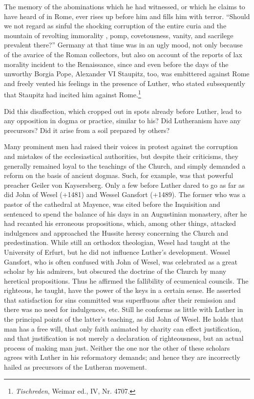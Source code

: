The memory of the abominations which he had witnessed, or
which he claims to have heard of in Rome, ever rises up before
him and fills him with terror. “Should we not regard as sinful the
shocking corruption of the entire curia and the mountain of revolting immorality
, pomp, covetousness, vanity, and sacrilege prevalent
there?” Germany at that time was in an ugly mood, not only
because of the avarice of the Roman collectors, but also on account
of the reports of lax morality incident to the Renaissance, since and
even before the days of the unworthy Borgia Pope, Alexander VI
Staupitz, too, was embittered against Rome and freely vented his feelings
in the presence of Luther, who stated subsequently that Staupitz
had incited him against Rome.\footnote{\textit{Tischreden}, Weimar ed., IV, Nr. 4707.}

Did this disaffection, which cropped out in spots already before
Luther, lead to any opposition in dogma or practice, similar to his?
Did Lutheranism have any precursors? Did it arise from a soil
prepared by others?

Many prominent men had raised their voices in protest against
the corruption and mistakes of the ecclesiastical authorities, but
despite their criticisms, they generally remained loyal to the teachings
of the Church, and simply demanded a reform on the basis
of ancient dogmas. Such, for example, was that powerful preacher
Geiler von Kaysersberg. Only a few before Luther dared to go as
far as did John of Wesel (+1481) and Wessel Gansfort (+1489).
The former who was a pastor of the cathedral at Mayence,
was cited before the Inquisition and sentenced to spend the balance
of his days in an Augustinian monastery, after he had recanted
his erroneous propositions, which, among other things, attacked indulgences
and approached the Hussite heresy concerning the Church
and predestination. While still an orthodox theologian, Wesel had
taught at the University of Erfurt, but he did not influence Luther’s
development. Wessel Gansfort, who is often confused with John
of Wesel, was celebrated as a great scholar by his admirers, but
obscured the doctrine of the Church by many heretical propositions.
Thus he affirmed the fallibility of ecumenical councils. The
righteous, he taught, have the power of the keys in a certain sense.
He asserted that satisfaction for sins committed was superfluous
after their remission and there was no need for indulgences, etc.
Still he conforms as little with Luther in the principal points of
the latter’s teaching, as did John of Wesel. He holds that man
has a free will, that only faith animated by charity can effect justification,
and that justification is not merely a declaration of righteousness,
but an actual process of making man just. Neither the one
nor the other of these scholars agrees with Luther in his reformatory
demands; and hence they are incorrectly hailed as precursors of the
Lutheran movement.


